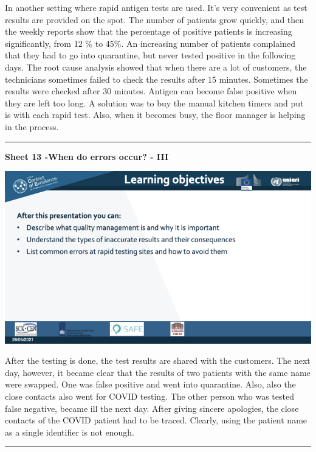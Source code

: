 \documentclass[
]{book}
\begin{document}
In another setting where rapid antigen tests are used. It's very
convenient as test results are provided on the spot. The number of
patients grow quickly, and then the weekly reports show that the
percentage of positive patients is increasing significantly, from 12 \%
to 45\%. An increasing number of patients complained that they had to go
into quarantine, but never tested positive in the following days. The
root cause analysis showed that when there are a lot of customers, the
technicians sometimes failed to check the results after 15 minutes.
Sometimes the results were checked after 30 minutes. Antigen can become
false positive when they are left too long. A solution was to buy the
manual kitchen timers and put is with each rapid test. Also, when it
becomes busy, the floor manager is helping in the process.

\begin{center}\rule{0.5\linewidth}{0.5pt}\end{center}

\textbf{Sheet 13 -When do errors occur? - III}

\includegraphics{images/m04/m04_Quality_management_v3.003.jpeg}

After the testing is done, the test results are shared with the
customers. The next day, however, it became clear that the results of
two patients with the same name were swapped. One was false positive and
went into quarantine. Also, also the close contacts also went for COVID
testing. The other person who was tested false negative, became ill the
next day. After giving sincere apologies, the close contacts of the
COVID patient had to be traced. Clearly, using the patient name as a
single identifier is not enough.

\begin{center}\rule{0.5\linewidth}{0.5pt}\end{center}
\end{document}
